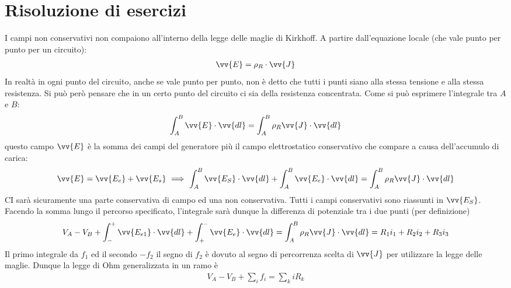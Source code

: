 \documentclass[a4paper, oneside]{article}
\begin{document}
\section{Risoluzione di esercizi}
I campi non conservativi non compaiono all'interno della legge delle 
maglie di Kirkhoff. A partire dall'equazione locale (che vale
punto per punto per un circuito):
\begin{gather*}
    \vv{E} = \rho_R \cdot  \vv{J}  
\end{gather*}
In realtà in ogni punto del circuito, anche se vale punto per punto, non è 
detto che tutti i punti siano alla stessa tensione e alla stessa resistenza.
Si può però pensare che in un certo punto del circuito ci sia della
resistenza concentrata. Come si può esprimere l'integrale tra $A$ e $B$:
\begin{gather*}
    \int_{A}^{B} \vv{E} \cdot \vv{dl} = \int_{A}^{B} \rho_R \vv{J} \cdot \vv{dl}      
\end{gather*}
questo campo $\vv{E}$ è la somma dei campi del generatore più il campo elettrostatico
conservativo che compare a causa dell'accumulo di carica:
\begin{gather*}
    \vv{E} = \vv{E_e} + \vv{E_s} \ \Longrightarrow \ \int_{A}^{B} \vv{E_S} \cdot \vv{dl} + \int_{A}^{B} \vv{E_e} \cdot \vv{dl} = \int_{A}^{B} \rho_R \vv{J} \cdot \vv{dl}             
\end{gather*} 
CI sarà sicuramente una parte conservativa di campo ed una non conservativa. Tutti i campi
conservativi sono riassunti in $\vv{E_S}$. Facendo la somma lungo il percorso specificato, 
l'integrale sarà dunque la differenza di potenziale tra i due punti (per definizione) 
\begin{gather*}
    V_A - V_B + \int_{-}^{+} \vv{E_{e1}} \cdot \vv{dl} + \int_{+}^{-} \vv{E_e} \cdot \vv{dl} = \int_{A}^{B} \rho_R \vv{J} \cdot \vv{dl}  = R_1 i_1 + R_2 i_2 + R_3 i_3 
\end{gather*} 
Il primo integrale da $f_1$ ed il secondo $-f_2$ il segno di $f_2$ è dovuto al segno di percorrenza
scelta di $\vv{J}$ per utilizzare la legge delle maglie. Dunque la legge di Ohm generalizzata in un ramo è 
\begin{gather*}
    V_A - V_B + \sum_{i} f_i = \sum_{k } iR_k
\end{gather*} 
\end{document}
